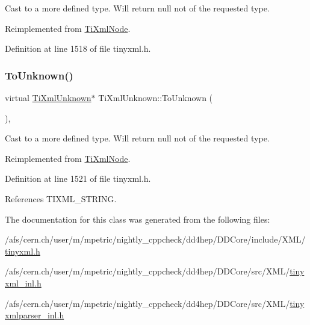 Cast to a more defined type. Will return null not of the requested type. 



Reimplemented from \hyperlink{class_ti_xml_node_ab4f2e6ce87d36c1b9b7de2529128a460}{Ti\+Xml\+Node}.



Definition at line 1518 of file tinyxml.\+h.

\hypertarget{class_ti_xml_unknown_a67c9fd22940e8c47f706a72cdd2e332c}{}\label{class_ti_xml_unknown_a67c9fd22940e8c47f706a72cdd2e332c} 
\subsubsection{\texorpdfstring{To\+Unknown()}{ToUnknown()}\hspace{0.1cm}{\footnotesize\ttfamily [2/2]}}
{\footnotesize\ttfamily virtual \hyperlink{class_ti_xml_unknown}{Ti\+Xml\+Unknown}$\ast$ Ti\+Xml\+Unknown\+::\+To\+Unknown (\begin{DoxyParamCaption}{ }\end{DoxyParamCaption})\hspace{0.3cm}{\ttfamily [inline]}, {\ttfamily [virtual]}}



Cast to a more defined type. Will return null not of the requested type. 



Reimplemented from \hyperlink{class_ti_xml_node_a06de5af852668c7e4af0d09c205f0b0d}{Ti\+Xml\+Node}.



Definition at line 1521 of file tinyxml.\+h.



References T\+I\+X\+M\+L\+\_\+\+S\+T\+R\+I\+NG.



The documentation for this class was generated from the following files\+:\begin{DoxyCompactItemize}
\item 
/afs/cern.\+ch/user/m/mpetric/nightly\+\_\+cppcheck/dd4hep/\+D\+D\+Core/include/\+X\+M\+L/\hyperlink{tinyxml_8h}{tinyxml.\+h}\item 
/afs/cern.\+ch/user/m/mpetric/nightly\+\_\+cppcheck/dd4hep/\+D\+D\+Core/src/\+X\+M\+L/\hyperlink{tinyxml__inl_8h}{tinyxml\+\_\+inl.\+h}\item 
/afs/cern.\+ch/user/m/mpetric/nightly\+\_\+cppcheck/dd4hep/\+D\+D\+Core/src/\+X\+M\+L/\hyperlink{tinyxmlparser__inl_8h}{tinyxmlparser\+\_\+inl.\+h}\end{DoxyCompactItemize}
